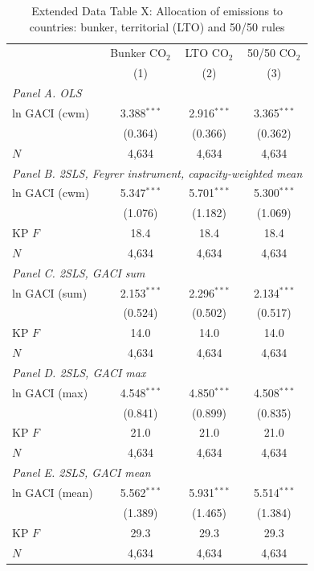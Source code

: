 \begin{table}[htbp]
\centering
\begin{threeparttable}
\caption{Extended Data Table X: Allocation of emissions to countries: bunker, territorial (LTO) and 50/50 rules}
\label{tab:alloc}
\footnotesize
\begin{tabular}{lccc}
\toprule
 & Bunker CO$_2$ & LTO CO$_2$ & 50/50 CO$_2$ \\
 & (1) & (2) & (3) \\
\midrule
\multicolumn{4}{l}{\textit{Panel A. OLS}} \\
  ln GACI (cwm) & 3.388$^{***}$ & 2.916$^{***}$ & 3.365$^{***}$ \\
   & (0.364) & (0.366) & (0.362) \\
  $N$ & 4,634 & 4,634 & 4,634 \\
\midrule
\multicolumn{4}{l}{\textit{Panel B. 2SLS, Feyrer instrument, capacity-weighted mean}} \\
  ln GACI (cwm) & 5.347$^{***}$ & 5.701$^{***}$ & 5.300$^{***}$ \\
   & (1.076) & (1.182) & (1.069) \\
  KP $F$ & 18.4 & 18.4 & 18.4 \\
  $N$ & 4,634 & 4,634 & 4,634 \\
\midrule
\multicolumn{4}{l}{\textit{Panel C. 2SLS, GACI sum}} \\
  ln GACI (sum) & 2.153$^{***}$ & 2.296$^{***}$ & 2.134$^{***}$ \\
   & (0.524) & (0.502) & (0.517) \\
  KP $F$ & 14.0 & 14.0 & 14.0 \\
  $N$ & 4,634 & 4,634 & 4,634 \\
\midrule
\multicolumn{4}{l}{\textit{Panel D. 2SLS, GACI max}} \\
  ln GACI (max) & 4.548$^{***}$ & 4.850$^{***}$ & 4.508$^{***}$ \\
   & (0.841) & (0.899) & (0.835) \\
  KP $F$ & 21.0 & 21.0 & 21.0 \\
  $N$ & 4,634 & 4,634 & 4,634 \\
\midrule
\multicolumn{4}{l}{\textit{Panel E. 2SLS, GACI mean}} \\
  ln GACI (mean) & 5.562$^{***}$ & 5.931$^{***}$ & 5.514$^{***}$ \\
   & (1.389) & (1.465) & (1.384) \\
  KP $F$ & 29.3 & 29.3 & 29.3 \\
  $N$ & 4,634 & 4,634 & 4,634 \\

\end{tabular}
\end{threeparttable}
\end{table}
